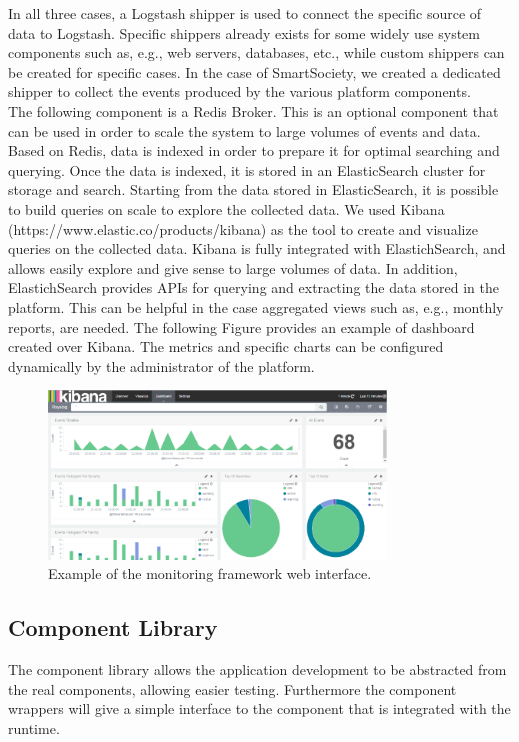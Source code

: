In all three cases, a Logstash shipper is used to connect the specific source of data to Logstash. Specific shippers already exists for some widely use system components such as, e.g., web servers, databases, etc., while custom shippers can be created for specific cases. In the case of SmartSociety, we created a dedicated shipper to collect the events produced by the various platform components.\\
The following component is a Redis Broker. This is an optional component that can be used in order to scale the system to large volumes of events and data. Based on Redis, data is indexed in order to prepare it for optimal searching and querying. Once the data is indexed, it is stored in an ElasticSearch cluster for storage and search. 
Starting from the data stored in ElasticSearch, it is possible to build queries on scale to explore the collected data. We used Kibana (https://www.elastic.co/products/kibana) as the tool to create and visualize queries on the collected data. Kibana is fully integrated with ElastichSearch, and allows easily explore and give sense to large volumes of data.
In addition, ElastichSearch provides APIs for querying and extracting the data stored in the platform. This can be helpful in the case aggregated views such as, e.g., monthly reports, are needed.
The following Figure provides an example of dashboard created over Kibana. The metrics and specific charts can be configured dynamically by the administrator of the platform.

\begin{figure}[!hbt]
\centering
\includegraphics[width=0.8\textwidth]{figs/kibana.pdf}
\caption{Example of the monitoring framework web interface.}
\end{figure}


\subsection{Component Library}

The component library allows the application development to be abstracted from the real components, allowing easier testing. 
Furthermore the component wrappers will give a simple interface to the component that is integrated with the runtime.


